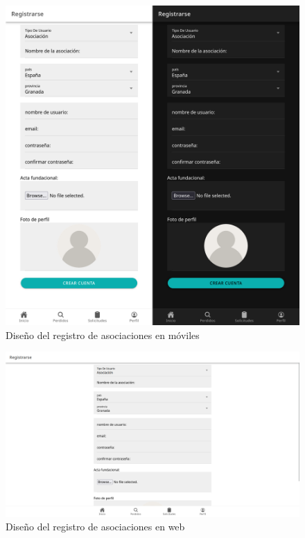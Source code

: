 \begin{figure} [H]
	\centering
	\includegraphics[width=1\linewidth]{sprint 3//hu8/implementacion.png}
	\caption{Diseño del registro de asociaciones en móviles}
	\label{fig:impRegAso}
\end{figure}

\begin{figure}[H]
	\centering
	\includegraphics[width=1\linewidth]{sprint 3//hu8/implementacionWeb.png}
	\caption{Diseño del registro de asociaciones en web}
\end{figure}

